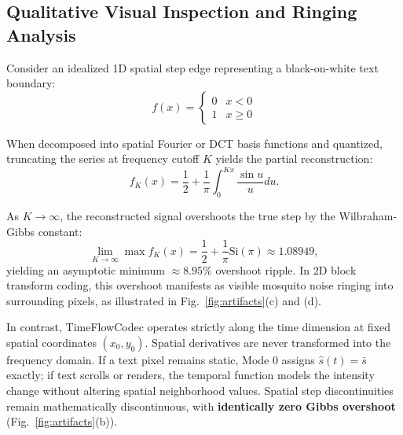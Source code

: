 \documentclass[conference]{IEEEtran}
\begin{document}
\subsection{Qualitative Visual Inspection and Ringing Analysis}
Consider an idealized 1D spatial step edge representing a black-on-white text boundary:
\begin{equation}
    f(x) = \begin{cases} 0 & x < 0 \\ 1 & x \ge 0 \end{cases}
\end{equation}

When decomposed into spatial Fourier or DCT basis functions and quantized, truncating the series at frequency cutoff $K$ yields the partial reconstruction:
\begin{equation}
    f_K(x) = \frac{1}{2} + \frac{1}{\pi}\int_0^{K x} \frac{\sin u}{u} du.
\end{equation}

As $K \to \infty$, the reconstructed signal overshoots the true step by the Wilbraham-Gibbs constant:
\begin{equation}
    \lim_{K \to \infty} \max f_K(x) = \frac{1}{2} + \frac{1}{\pi} \text{Si}(\pi) \approx 1.08949,
\end{equation}
yielding an asymptotic minimum $\approx 8.95\%$ overshoot ripple. In 2D block transform coding, this overshoot manifests as visible mosquito noise ringing into surrounding pixels, as illustrated in Fig.~\ref{fig:artifacts}(c) and (d).

In contrast, TimeFlowCodec operates strictly along the time dimension at fixed spatial coordinates $(x_0, y_0)$. Spatial derivatives are never transformed into the frequency domain. If a text pixel remains static, Mode 0 assigns $\hat{s}(t) = \bar{s}$ exactly; if text scrolls or renders, the temporal function models the intensity change without altering spatial neighborhood values. Spatial step discontinuities remain mathematically discontinuous, with \textbf{identically zero Gibbs overshoot} (Fig.~\ref{fig:artifacts}(b)).
\end{document}
